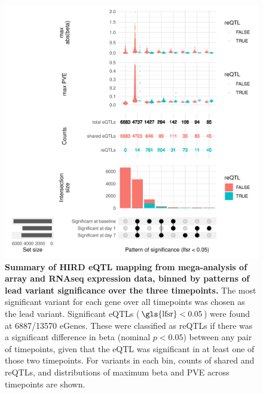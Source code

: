\begin{figure}
    \centering
    \includegraphics[width=1.0\textwidth]{mainmatter/figures/chapter_03/compare_dge_eqtl.upset.pdf}
    \caption[
    ]{
        \textbf{Summary of \gls{HIRD} \gls{eQTL} mapping from mega-analysis of array and \gls{RNAseq} expression data, binned by patterns of lead variant significance over the three timepoints.}
        The most significant variant for each gene over all timepoints was chosen as the lead variant.
        Significant \glspl{eQTL} ($\text{\gls{lfsr}} < 0.05$) were found at \num{6887/13570} eGenes.
        These were classified as \glspl{reQTL} if there was a significant difference in beta (nominal $p < 0.05$) between any pair of timepoints,
        given that the \gls{eQTL} was significant in at least one of those two timepoints.
        For variants in each bin, counts of shared and \glspl{reQTL}, and distributions of maximum beta and \gls{PVE} across timepoints are shown.
    }
    \label{fig:hird_reQTL_upset_mega}
\end{figure}

